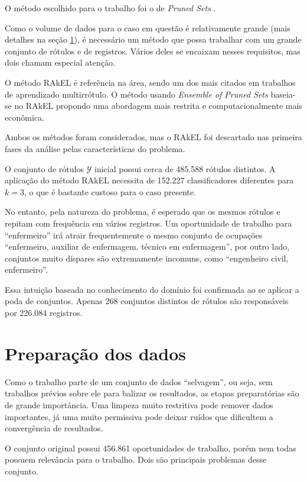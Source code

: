 \documentclass[runningheads,a4paper]{llncs}
\begin{document}
O método escolhido para o trabalho foi o de \textit{Pruned Sets} \cite{Read2008-bt}.

Como o volume de dados para o caso em questão é relativamente grande (mais detalhes na seção \ref{sec:preparacao}), é necessário um método que possa trabalhar com um grande conjunto de rótulos e de registros. Vários deles se encaixam nesses requisitos, mas dois chamam especial atenção.

O método RAkEL \cite{Tsoumakas2007-wm} é referência na área, sendo um dos mais citados em trabalhos de aprendizado multirrótulo. O método usando \textit{Ensemble of Pruned Sets} baseia-se no RAkEL propondo uma abordagem mais restrita e computacionalmente mais econômica.

Ambos os métodos foram considerados, mas o RAkEL foi descartado nas primeira fases da análise pelas características do problema.

O conjunto de rótulos $\mathcal{Y}$ inicial possui cerca de 485.588 rótulos distintos. A aplicação do método RAkEL \cite{Tsoumakas2007-wm} necessita de 152.227 classificadores diferentes para $k=3$, o que é bastante custoso para o caso presente.

No entanto, pela natureza do problema, é esperado que os mesmos rótulos e repitam com frequência em vários registros. Um oportunidade de trabalho para \enquote{enfermeiro} irá atrair frequentemente o mesmo conjunto de ocupações \enquote{enfermeiro, auxiliar de enfermagem, técnico em enfermagem}, por outro lado, conjuntos muito díspares são extremamente incomuns, como \enquote{engenheiro civil, enfermeiro}.

Essa intuição baseada no conhecimento do domínio foi confirmada ao se aplicar a poda de conjuntos. Apenas 268 conjuntos distintos de rótulos são responsáveis por 226.084 registros.

\section{Preparação dos dados} \label{sec:preparacao}

Como o trabalho parte de um conjunto de dados \enquote{selvagem}, ou seja, sem trabalhos prévios sobre ele para balizar os resultados, as etapas preparatórias são de grande importância. Uma limpeza muito restritiva pode remover dados importantes, já uma muito permissiva pode deixar ruídos que dificultem a convergência de resultados.

O conjunto original possui 456.861 oportunidades de trabalho, porém nem todas possuem relevância para o trabalho. Dois são principais problemas desse conjunto.
\end{document}
